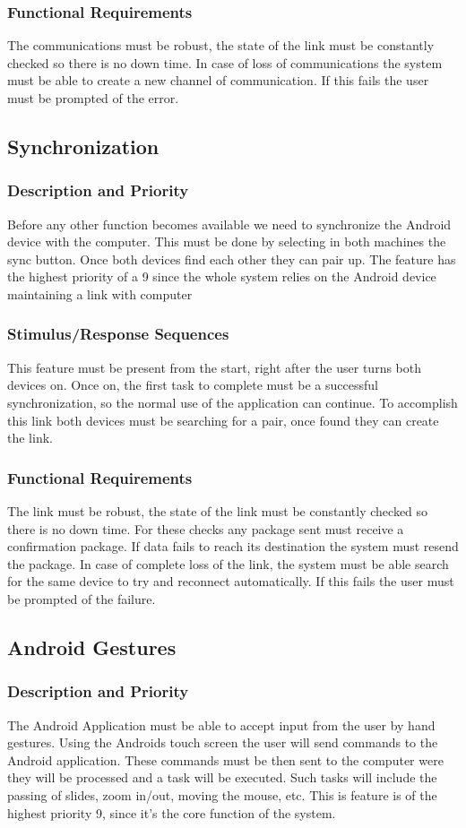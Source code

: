 \documentclass{article}
\begin{document}
\subsubsection{Functional Requirements}
The communications must be robust, the state of the link must be constantly checked so there is no down time. In case of loss of communications the system must be able to create a new channel of communication. If this fails the user must be prompted of the error.

\subsection{Synchronization}
\subsubsection{Description and Priority}
Before any other function becomes available we need to synchronize the Android device with the computer. This must be done by selecting in both machines the sync button. Once both devices find each other they can pair up. The feature has the highest priority of a 9 since the whole system relies on the Android device maintaining a link with computer
\subsubsection{Stimulus/Response Sequences}
This feature must be present from the start, right after the user turns both devices on. Once on, the first task to complete must be a successful synchronization, so the normal use of the application can continue. To accomplish this link both devices must be searching for a pair, once found they can create the link.
\subsubsection{Functional Requirements}
The link must be robust, the state of the link must be constantly checked so there is no down time. For these checks any package sent must receive a confirmation package.  If data fails to reach its destination the system must resend the package. In case of complete loss of the link, the system must be able search for the same device to try and reconnect automatically. If this fails the user must be prompted of the failure.
\subsection{Android Gestures}
\subsubsection{Description and Priority}
The Android Application must be able to accept input from the user by hand gestures. Using the Androids touch screen the user will send commands to the Android application. These commands must be then sent to the computer were they will be processed and a task will be executed. Such tasks will include the passing of slides, zoom in/out, moving the mouse, etc. This is feature is of the highest priority 9, since it’s the core function of the system.
\end{document}
